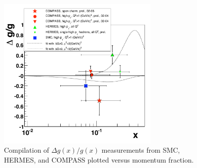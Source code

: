 \begin{figure}
  \centering
  \includegraphics[width=0.7\textwidth]{figures/compass_deltag_with_prelim}
  \caption{Compilation of $\Delta g(x)/g(x)$ measurements from SMC, HERMES,
  and COMPASS plotted versus momentum fraction.}
  \label{fig:pgf-deltag}
\end{figure}


